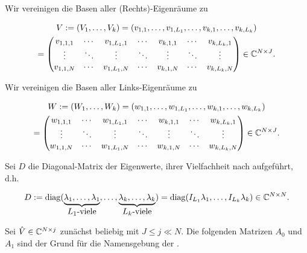 Wir vereinigen die Basen aller (Rechts)-Eigenräume zu

\begin{multline*}
    V
    :=
    (V_1, \dots, V_k)
    =
    (v_{1, 1}, \dots, v_{1, L_1}, \dots, v_{k, 1}, \dots, v_{k, L_k}) \\
    =
    \begin{pmatrix}
        v_{1, 1, 1} & \cdots & v_{1, L_1, 1} & \cdots & v_{k, 1, 1} & \cdots & v_{k, L_k, 1} \\
        \vdots      & \ddots & \vdots        & \ddots & \vdots      & \ddots & \vdots        \\
        v_{1, 1, N} & \cdots & v_{1, L_1, N} & \cdots & v_{k, 1, N} & \cdots & v_{k, L_k, N}
    \end{pmatrix}
    \in
    \mathbb{C}^{N \times J}.
\end{multline*}

Wir vereinigen die Basen aller Links-Eigenräume zu

\begin{multline*}
    W
    :=
    (W_1, \dots, W_k)
    =
    (w_{1, 1}, \dots, w_{1, L_1}, \dots, w_{k, 1}, \dots, w_{k, L_k}) \\
    =
    \begin{pmatrix}
        w_{1, 1, 1} & \cdots & w_{1, L_1, 1} & \cdots & w_{k, 1, 1} & \cdots & w_{k, L_k, 1} \\
        \vdots      & \ddots & \vdots        & \ddots & \vdots      & \ddots & \vdots        \\
        w_{1, 1, N} & \cdots & w_{1, L_1, N} & \cdots & w_{k, 1, N} & \cdots & w_{k, L_k, N}
    \end{pmatrix}
    \in
    \mathbb{C}^{N \times J}.
\end{multline*}

Sei $D$ die Diagonal-Matrix der Eigenwerte, ihrer Vielfachheit nach aufgeführt, d.h.

\begin{align} \label{eq:diagonal_matrix}
    D
    :=
    \operatorname{diag}
    (
        \underbrace
        {
            \lambda_1, \dots, \lambda_1
        }_{
            \displaystyle
            \text{$L_1$-viele}
        },
        \dots,
        \underbrace
        {
            \lambda_k, \dots, \lambda_k
        }_{
            \displaystyle
            \text{$L_k$-viele}
        }
    )
    =
    \operatorname{diag}(I_{L_1} \lambda_1, \dots, I_{L_k} \lambda_k)
    \in
    \mathbb{C}^{N \times N}.
\end{align}

Sei $\hat V \in \mathbb{C}^{N \times j}$ zunächst beliebig mit $J \leq j \ll N$.
Die folgenden Matrizen $A_0$ und $A_1$ sind der Grund für die Namensgebung der .

